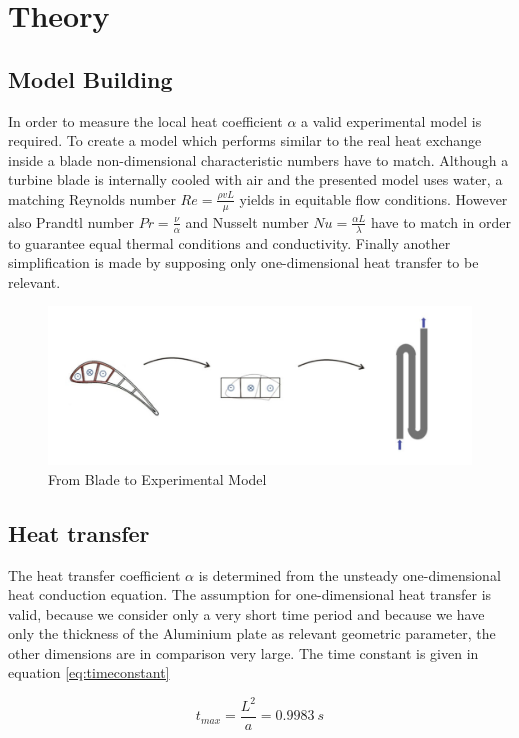 \chapter{Theory}\label{sec:methodofattack}

\section{Model Building}
In order to measure the local heat coefficient $\alpha$ a valid experimental model is required. To create a model which performs similar to the real heat exchange inside a blade non-dimensional characteristic numbers have to match. Although a turbine blade is internally cooled with air and the presented model uses water, a matching Reynolds number $Re=\frac{\rho v L}{\mu}$ yields in equitable flow conditions. However also Prandtl number $Pr=\frac{\nu}{\alpha}$ and Nusselt number $Nu=\frac{\alpha L}{\lambda}$ have to match in order to guarantee equal thermal conditions and conductivity. Finally another simplification is made by supposing only one-dimensional heat transfer to be relevant.
\begin{figure}[H]
\centering
\includegraphics[width=.8\textwidth]{pics/modelbuilding}
\caption{From Blade to Experimental Model}
\label{pic:modelbuilding}
\end{figure}

\section{Heat transfer}

The heat transfer coefficient $\alpha$ is determined from the unsteady one-dimensional heat conduction equation. The assumption for one-dimensional heat transfer is valid, because we consider only a very short time period and because we have only the thickness of the Aluminium plate as relevant geometric parameter, the other dimensions are in comparison very large. The time constant is given in equation \ref{eq:timeconstant}

\begin{equation}
t_{max}=\frac{L^2}{a}=0.9983\ s
\label{eq:timeconstant}
\end{equation}

